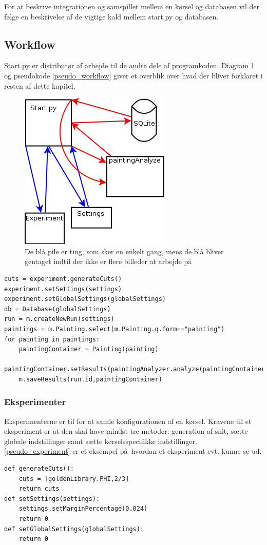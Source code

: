 {
For at beskrive integrationen og samspillet mellem en kørsel og
databasen vil der følge en beskrivelse af de vigtige kald mellem 
start.py og databasen. 
\subsection{Workflow}
Start.py er distributør af arbejde til de andre dele af programkoden.
Diagram \ref{start_workflow} og pseudokode \ref{pseudo_workflow} giver et overblik over hvad der bliver
forklaret i resten af dette kapitel. 
\begin{figure}[h!]
	\begin{center}
		\includegraphics[scale=0.5]{afsnit/implementation/billeder/workflow_start_py.png}
	\end{center}
	\caption{De blå pile er ting, som sker en enkelt gang, mens de blå
	\label{start_workflow}
	bliver gentaget indtil der ikke er flere billeder at arbejde på}
\end{figure}
\begin{lstlisting}[caption={Pseudokode for
start},frame=tb,label={pseudo_workflow}]
cuts = experiment.generateCuts()
experiment.setSettings(settings)
experiment.setGlobalSettings(globalSettings)
db = Database(globalSettings)
run = m.createNewRun(settings)
paintings = m.Painting.select(m.Painting.q.form=="painting")
for painting in paintings:
	paintingContainer = Painting(painting)
	paintingContainer.setResults(paintingAnalyzer.analyze(paintingContainer,settings))
	m.saveResults(run.id,paintingContainer)
\end{lstlisting}
\subsubsection{Eksperimenter}
Eksperimenterne er til for at samle konfigurationen af en kørsel.
Kravene til et eksperiment er at den skal have mindst tre metoder:
generation af snit, sætte globale indstillinger samt sætte
kørselsspecifikke indstillinger. \ref{pseudo_experiment} er et eksempel
på hvordan et eksperiment evt. kunne se ud.
\begin{lstlisting}[caption={Pseudokode for et
experiment, som checker på $\varPhi$},frame=tb,label={pseudo_experiment}]
def generateCuts():
	cuts = [goldenLibrary.PHI,2/3]
	return cuts
def setSettings(settings):
	settings.setMarginPercentage(0.024)
	return 0
def setGlobalSettings(globalSettings):
	return 0
\end{lstlisting}
}
